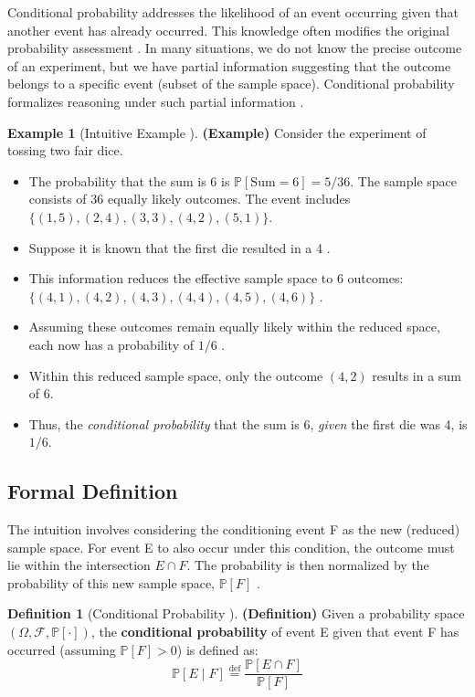 \documentclass[12pt, a4paper]{article}
\theoremstyle{definition}
\newtheorem{definition}{Definition}[section]
\newtheorem{example}{Example}[section] %
\theoremstyle{plain}
\newcommand{\Prob}[1]{\mathbb{P}\left[#1\right]} %
\newcommand{\condProb}[2]{\mathbb{P}\left[#1 \mid #2\right]} %
\newcommand{\intersect}{\cap} %
\newcommand{\samplespace}{\Omega} %
\begin{document}
Conditional probability addresses the likelihood of an event occurring given that another event has already occurred. This knowledge often modifies the original probability assessment \cite{Chan, FacultyNotes}. In many situations, we do not know the precise outcome of an experiment, but we have partial information suggesting that the outcome belongs to a specific event (subset of the sample space). Conditional probability formalizes reasoning under such partial information \cite{FacultyNotes}.

\begin{example}[Intuitive Example \cite{Ross}]
\textbf{(Example)} Consider the experiment of tossing two fair dice.
\begin{itemize}
    \item The probability that the sum is 6 is $\Prob{\text{Sum}=6} = 5/36$. The sample space consists of 36 equally likely outcomes. The event includes $\{(1,5), (2,4), (3,3), (4,2), (5,1)\}$.
    \item Suppose it is known that the first die resulted in a 4 \cite{Ross}.
    \item This information reduces the effective sample space to 6 outcomes: \\ $\{(4,1), (4,2), (4,3), (4,4), (4,5), (4,6)\}$ \cite{Ross}.
    \item Assuming these outcomes remain equally likely within the reduced space, each now has a probability of $1/6$ \cite{Ross}.
    \item Within this reduced sample space, only the outcome $(4,2)$ results in a sum of 6.
    \item Thus, the \textit{conditional probability} that the sum is 6, \textit{given} the first die was 4, is $1/6$.
\end{itemize}
\end{example}

\subsection{Formal Definition}

The intuition involves considering the conditioning event F as the new (reduced) sample space. For event E to also occur under this condition, the outcome must lie within the intersection $E \intersect F$. The probability is then normalized by the probability of this new sample space, $\Prob{F}$ \cite{Ross, Chan, FacultyNotes}.

\begin{definition}[Conditional Probability \cite{Ross, Chan, FacultyNotes}]
\textbf{(Definition)} Given a probability space $(\samplespace, \mathcal{F}, \Prob{\cdot})$, the \textbf{conditional probability} of event E given that event F has occurred (assuming $\Prob{F} > 0$) is defined as:
\[ \condProb{E}{F} \stackrel{\text{def}}{=} \frac{\Prob{E \intersect F}}{\Prob{F}} \]
\end{definition}
\end{document}
